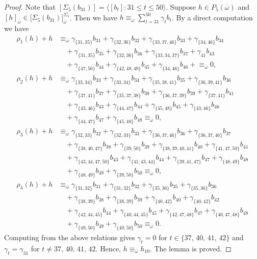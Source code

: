 \documentclass[reqno]{amsart}
\theoremstyle{plain}
\theoremstyle{definition}
\theoremstyle{plain}
\theoremstyle{definition}
\numberwithin{equation}{section}
\begin{document}
\begin{proof}
Note that $[\Sigma_5(b_{31})] = \langle [b_t]: 31 \leqslant t \leqslant 50\rangle$. Suppose $h \in P_5(\overline{\omega})$ and $[h]_{\overline{\omega}} \in \mathcal [\Sigma_5(b_{31})]_{\overline{\omega}}^{\Sigma_5}$. Then we have
$h \equiv_{\overline{\omega}} \sum_{t=31}^{50}\gamma_tb_t$. By a direct computation we have 
\begin{align*}
\rho_1(h)+h &\equiv_{\overline{\omega}} \gamma_{\{31,35\}}b_{31} + \gamma_{\{32,36\}}b_{32} + \gamma_{\{33,37,46\}}b_{33} + \gamma_{\{34,46\}}b_{34}\\ &\quad + \gamma_{\{31,35\}}b_{35} + \gamma_{\{32,36\}}b_{36} + \gamma_{\{33,34,37\}}b_{37} + \gamma_{41}b_{43}\\ &\quad + \gamma_{\{47,50\}}b_{44} + \gamma_{\{42,48,49\}}b_{45} + \gamma_{\{34,46\}}b_{46} +  \equiv_{\overline{\omega}} 0,\\ 
\rho_2(h)+h &\equiv_{\overline{\omega}} \gamma_{\{33,34\}}b_{33} + \gamma_{\{33,34\}}b_{34} + \gamma_{\{35,38,41\}}b_{35} + \gamma_{\{36,39,41\}}b_{36}\\ &\quad + \gamma_{\{37,41\}}b_{37} + \gamma_{\{35,37,38\}}b_{38} + \gamma_{\{36,37,39\}}b_{39} + \gamma_{\{37,41\}}b_{41}\\ &\quad + \gamma_{\{43,46\}}b_{43} + \gamma_{\{44,47\}}b_{44} + \gamma_{\{45,48\}}b_{45} + \gamma_{\{43,46\}}b_{46}\\ &\quad + \gamma_{\{44,47\}}b_{47} + \gamma_{\{45,48\}}b_{48} \equiv_{\overline{\omega}} 0,\\
\rho_3(h)+h &\equiv_{\overline{\omega}} \gamma_{\{32,33\}}b_{32} + \gamma_{\{32,33\}}b_{33} + \gamma_{\{36,37,46\}}b_{36} + \gamma_{\{36,37,46\}}b_{37}\\ &\quad + \gamma_{\{38,40,47\}}b_{38} + \gamma_{\{39,50\}}b_{39} + \gamma_{\{38,39,40,41\}}b_{40} + \gamma_{\{41,47,50\}}b_{41}\\ &\quad + \gamma_{\{43,44,47,50\}}b_{43} + \gamma_{\{41,43,44\}}b_{44} + \gamma_{\{39,41,47\}}b_{47} + \gamma_{\{48,49\}}b_{48}\\ &\quad + \gamma_{\{48,49\}}b_{49} + \gamma_{\{39,50\}}b_{50} \equiv_{\overline{\omega}} 0,\\
\rho_4(h)+h &\equiv_{\overline{\omega}} \gamma_{\{31,32\}}b_{31} + \gamma_{\{31,32\}}b_{32} + \gamma_{\{35,36\}}b_{35} + \gamma_{\{35,36\}}b_{36}\\ &\quad + \gamma_{\{38,39\}}b_{38} + \gamma_{\{38,39\}}b_{39} + \gamma_{\{40,42\}}b_{40} + \gamma_{\{40,42\}}b_{42}\\ &\quad + \gamma_{\{42,44,45\}}b_{44} + \gamma_{\{40,44,45\}}b_{45} + \gamma_{\{42,47,48\}}b_{47} + \gamma_{\{40,47,48\}}b_{48}\\ &\quad + \gamma_{\{49,50\}}b_{49} + \gamma_{\{49,50\}}b_{50} \equiv_{\overline{\omega}} 0.
\end{align*}
Computing from the above relations gives $\gamma_t = 0$ for $t\in \{37,\, 40,\, 41,\, 42\}$ and $\gamma_t = \gamma_{31}$ for $t \ne 37,\, 40,\, 41,\, 42$. Hence, $h \equiv_{\overline{\omega}} h_{10}$. The lemma is proved.
\end{proof}
\end{document}
